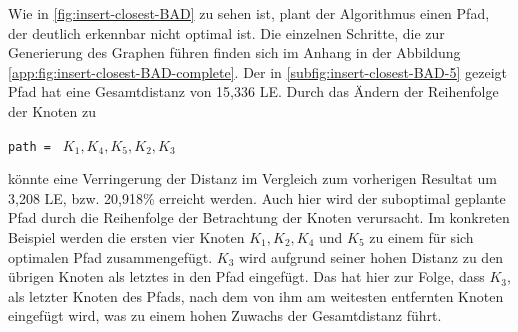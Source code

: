 Wie in \vref{fig:insert-closest-BAD} zu sehen ist, plant der Algorithmus einen Pfad, der deutlich erkennbar nicht optimal ist.
Die einzelnen Schritte, die zur Generierung des Graphen führen finden sich im Anhang in der Abbildung \vref{app:fig:insert-closest-BAD-complete}.
Der in \vref{subfig:insert-closest-BAD-5} gezeigt Pfad hat eine Gesamtdistanz von 15,336 \ac{LE}.
Durch das Ändern der Reihenfolge der Knoten zu
\begin{addmargin}[1em]{2em}
    \lstinline{path = } $K_1, K_4, K_5, K_2, K_3$ 
\end{addmargin}
könnte eine Verringerung der Distanz im Vergleich zum vorherigen Resultat um 3,208 \ac{LE}, bzw. 20,918\% erreicht werden.
Auch hier wird der suboptimal geplante Pfad durch die Reihenfolge der Betrachtung der Knoten verursacht.
Im konkreten Beispiel werden die ersten vier Knoten $K_1, K_2, K_4$ und $K_5$ zu einem für sich optimalen Pfad zusammengefügt.
$K_3$ wird aufgrund seiner hohen Distanz zu den übrigen Knoten als letztes in den Pfad eingefügt.
Das hat hier zur Folge, dass $K_3$, als letzter Knoten des Pfads, nach dem von ihm am weitesten entfernten Knoten eingefügt wird, was zu einem hohen Zuwachs der Gesamtdistanz führt.